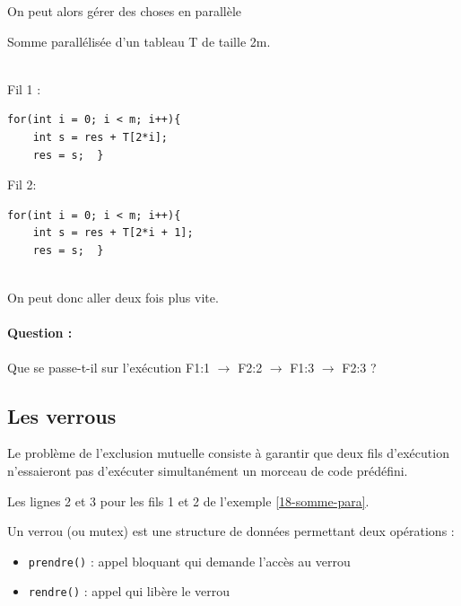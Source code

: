 \begin{idee}
	On peut alors gérer des choses en parallèle
\end{idee}

\begin{example}
	\label{18-somme-para} \normalfont
	Somme parallélisée d'un tableau T de taille 2m.\\\\
	\begin{minipage}{0.45\linewidth}
		Fil 1 :
		\begin{lstlisting}[style=CStyle]
for(int i = 0; i < m; i++){
	int s = res + T[2*i];
	res = s;  }\end{lstlisting}
	\end{minipage} \quad
	\begin{minipage}{0.45\linewidth}
		Fil 2:
	\begin{lstlisting}[style=CStyle]
for(int i = 0; i < m; i++){
	int s = res + T[2*i + 1];
	res = s;  }\end{lstlisting}
	\end{minipage}\\
	On peut donc aller deux fois plus vite.
	
	\paragraph{Question :} Que se passe-t-il sur l'exécution F1:1 $\to$ F2:2 $\to$ F1:3 $\to$ F2:3 ?
\end{example}

\subsection{Les verrous}

\begin{definition}
	Le problème de l'exclusion mutuelle consiste à garantir que deux fils d'exécution n'essaieront pas d'exécuter simultanément un morceau de code prédéfini.
\end{definition}

\begin{example}
	Les lignes 2 et 3 pour les fils 1 et 2 de l'exemple \ref{18-somme-para}.
\end{example}

\begin{definition}
	Un verrou (ou mutex) est une structure de données permettant deux opérations : \begin{itemize}
		\item \texttt{prendre()} : appel bloquant qui demande l'accès au verrou
		\item \texttt{rendre()} : appel qui libère le verrou
	\end{itemize}
\end{definition}

